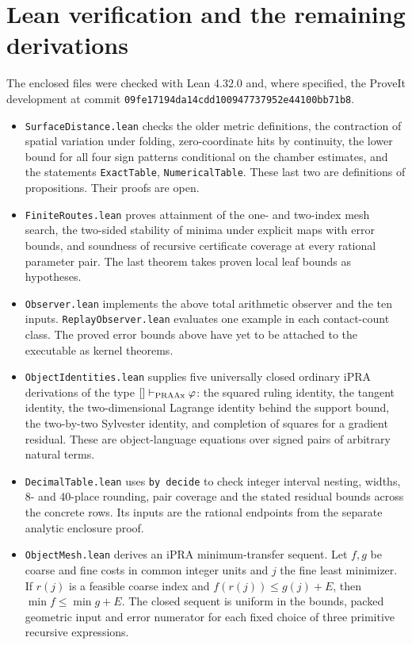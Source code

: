 \section{Lean verification and the remaining derivations}
The enclosed files were checked with Lean 4.32.0 and, where specified,
the ProveIt development at commit
\texttt{09fe17194da14cdd100947737952e44100bb71b8}.
\begin{itemize}
\item \texttt{SurfaceDistance.lean} checks the older metric definitions,
the contraction of spatial variation under folding, zero-coordinate hits by continuity, the lower bound for all four sign patterns conditional on the chamber estimates, and the statements
\texttt{ExactTable}, \texttt{NumericalTable}. These last two are
definitions of propositions. Their proofs are open.
\item \texttt{FiniteRoutes.lean} proves attainment of the one- and
two-index mesh search, the two-sided stability of minima under explicit
maps with error bounds, and soundness of recursive certificate coverage
at every rational parameter pair. The last theorem takes proven local
leaf bounds as hypotheses.
\item \texttt{Observer.lean} implements the above total arithmetic
observer and the ten inputs. \texttt{ReplayObserver.lean} evaluates one
example in each contact-count class. The proved error bounds above
have yet to be attached to the executable as kernel theorems.
\item \texttt{ObjectIdentities.lean} supplies five universally closed
ordinary iPRA derivations of the type
$[]\vdash_{\rm PRAAx}\varphi$: the squared ruling identity, the tangent
identity, the two-dimensional Lagrange identity behind the support bound,
the two-by-two Sylvester identity, and completion of squares for a
gradient residual. These are object-language equations over signed
pairs of arbitrary natural terms.
\item \texttt{DecimalTable.lean} uses \texttt{by decide} to check integer interval nesting, widths, 8- and 40-place rounding, pair coverage and the stated residual bounds across the concrete rows. Its inputs are the rational endpoints from the separate analytic enclosure proof.
\item \texttt{ObjectMesh.lean} derives an iPRA minimum-transfer
sequent. Let $f,g$ be coarse and fine costs in common integer units
and $j$ the fine least minimizer. If $r(j)$ is a feasible coarse index
and $f(r(j))\le g(j)+E$, then $\min f\le\min g+E$. The closed sequent
is uniform in the bounds, packed geometric input and error numerator
for each fixed choice of three primitive recursive expressions.
\end{itemize}

